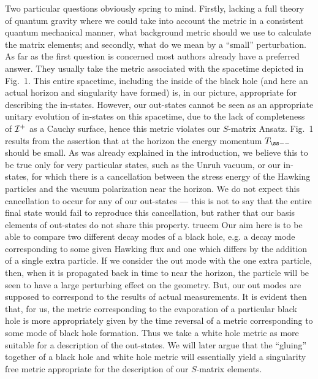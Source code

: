 Two particular questions obviously spring to mind. Firstly, lacking a
full theory of quantum gravity where we could take into account the
metric in a consistent quantum mechanical manner, what background
metric should we use to calculate the matrix elements; and secondly,
what do we mean by a ``small'' perturbation. As far as the first
question is concerned most authors already have a preferred answer.
They usually take the metric associated with the spacetime depicted in
Fig.~1.  This entire spacetime, including the inside of the black hole
(and here an actual horizon and singularity have formed) is, in our
picture, appropriate for describing the in-states.  However, our
out-states cannot be seen as an appropriate unitary evolution of
in-states on this spacetime, due to the lack of completeness of $\cal
I^+$ as a Cauchy surface,  hence this metric violates our $S$-matrix
Ansatz. Fig.~1 results from the assertion that at the horizon the
energy momentum $T_{\ss --}$ should be small. As was already explained in
the introduction, we believe this to be true only for very particular
states, such as the Unruh vacuum, or our in-states, for which there is
a cancellation between the stress energy of the Hawking particles and
the vacuum polarization near the horizon. We do not expect this
cancellation to occur for any of our out-states --- this is not to
say that the entire final state would fail to reproduce this
cancellation, but rather that our basis elements of out-states
do not share this property.
\midinsert
{} truecm
\endinsert
Our aim here is
to be able to compare two different decay modes of a black hole, e.g. a
decay mode corresponding to some given Hawking flux and one which
differs by the addition of a single extra particle. If we consider the
out mode with the one extra particle, then, when it is propagated back
in time to near the horizon, the particle will be seen to have a large
perturbing effect on the geometry. But, our out modes
are supposed to correspond to the results of actual measurements. It is
evident then that, for us, the metric corresponding to the evaporation
of a particular black hole is more appropriately given by the time
reversal of a metric corresponding to some mode of black hole
formation. Thus we take a white hole metric as more suitable for a
description of the out-states. We will later argue that the ``gluing''
together of a black hole and white hole metric will essentially yield a
singularity free metric appropriate for the description of our
$S$-matrix elements.

